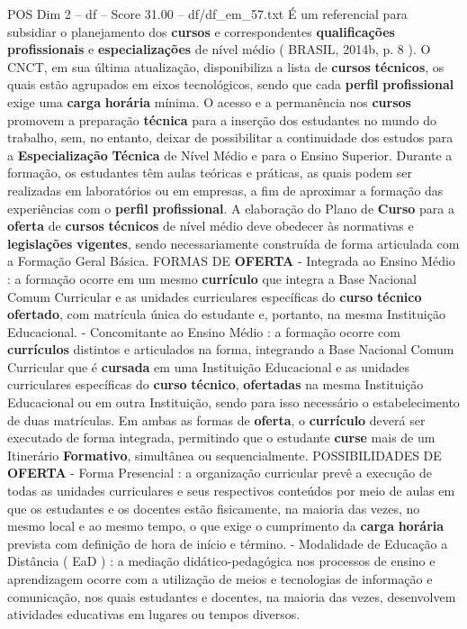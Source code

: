 \begin{textsample}{POS Dim 2 – df – Score 31.00 – df/df\_em\_57.txt}
É um referencial para subsidiar o planejamento dos \textbf{cursos} e correspondentes \textbf{qualificações} \textbf{profissionais} e \textbf{especializações} de nível médio ( BRASIL, 2014b, p. 8 ).
O CNCT, em sua última atualização, disponibiliza a lista de \textbf{cursos} \textbf{técnicos}, os quais estão agrupados em eixos tecnológicos, sendo que cada \textbf{perfil} \textbf{profissional} exige uma \textbf{carga} \textbf{horária} mínima.
O acesso e a permanência nos \textbf{cursos} promovem a preparação \textbf{técnica} para a inserção dos estudantes no mundo do trabalho, sem, no entanto, deixar de possibilitar a continuidade dos estudos para a \textbf{Especialização} \textbf{Técnica} de Nível Médio e para o Ensino Superior.
Durante a formação, os estudantes têm aulas teóricas e práticas, as quais podem ser realizadas em laboratórios ou em empresas, a fim de aproximar a formação das experiências com o \textbf{perfil} \textbf{profissional}.
A elaboração do Plano de \textbf{Curso} para a \textbf{oferta} de \textbf{cursos} \textbf{técnicos} de nível médio deve obedecer às normativas e \textbf{legislações} \textbf{vigentes}, sendo necessariamente construída de forma articulada com a Formação Geral Básica.
FORMAS DE \textbf{OFERTA} - Integrada ao Ensino Médio : a formação ocorre em um mesmo \textbf{currículo} que integra a Base Nacional Comum Curricular e as unidades curriculares específicas do \textbf{curso} \textbf{técnico} \textbf{ofertado}, com matrícula única do estudante e, portanto, na mesma Instituição Educacional. - Concomitante ao Ensino Médio : a formação ocorre com \textbf{currículos} distintos e articulados na forma, integrando a Base Nacional Comum Curricular que é \textbf{cursada} em uma Instituição Educacional e as unidades curriculares específicas do \textbf{curso} \textbf{técnico}, \textbf{ofertadas} na mesma Instituição Educacional ou em outra Instituição, sendo para isso necessário o estabelecimento de duas matrículas.
Em ambas as formas de \textbf{oferta}, o \textbf{currículo} deverá ser executado de forma integrada, permitindo que o estudante \textbf{curse} mais de um Itinerário \textbf{Formativo}, simultânea ou sequencialmente.
POSSIBILIDADES DE \textbf{OFERTA} - Forma Presencial : a organização curricular prevê a execução de todas as unidades curriculares e seus respectivos conteúdos por meio de aulas em que os estudantes e os docentes estão fisicamente, na maioria das vezes, no mesmo local e ao mesmo tempo, o que exige o cumprimento da \textbf{carga} \textbf{horária} prevista com definição de hora de início e término. - Modalidade de Educação a Distância ( EaD ) : a mediação didático-pedagógica nos processos de ensino e aprendizagem ocorre com a utilização de meios e tecnologias de informação e comunicação, nos quais estudantes e docentes, na maioria das vezes, desenvolvem atividades educativas em lugares ou tempos diversos.

\end{textsample}
